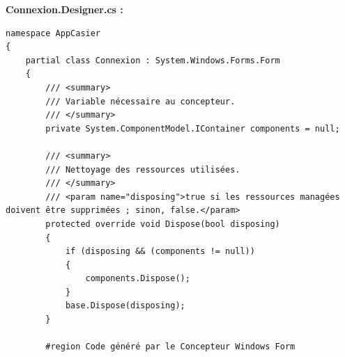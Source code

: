 \documentclass[main.tex]{subfiles}
\begin{document}
\textbf{Connexion.Designer.cs :}

\begin{lstlisting}
namespace AppCasier
{
    partial class Connexion : System.Windows.Forms.Form
    {
        /// <summary>
        /// Variable nécessaire au concepteur.
        /// </summary>
        private System.ComponentModel.IContainer components = null;

        /// <summary>
        /// Nettoyage des ressources utilisées.
        /// </summary>
        /// <param name="disposing">true si les ressources managées doivent être supprimées ; sinon, false.</param>
        protected override void Dispose(bool disposing)
        {
            if (disposing && (components != null))
            {
                components.Dispose();
            }
            base.Dispose(disposing);
        }

        #region Code généré par le Concepteur Windows Form


\end{lstlisting}
\end{document}
